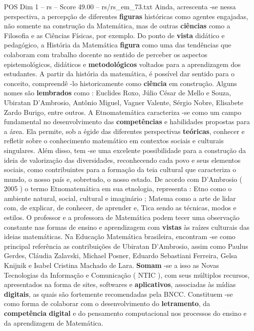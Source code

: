 \begin{textsample}{POS Dim 1 – rs – Score 49.00 – rs/rs\_em\_73.txt}
Ainda, acrescenta -se nessa perspectiva, a percepção de diferentes \textbf{figuras} históricas como agentes engajadas, não somente na construção da Matemática, mas de outras \textbf{ciências} como a Filosofia e as Ciências Físicas, por exemplo.
Do ponto de \textbf{vista} didático e pedagógico, a História da Matemática \textbf{figura} como uma das tendências que colaboram com trabalho docente no sentido de perceber os aspectos epistemológicos, didáticos e \textbf{metodológicos} voltados para a aprendizagem dos estudantes.
A partir da história da matemática, é possível dar sentido para o conceito, compreendê -lo historicamente como \textbf{ciência} em construção.
Alguns nomes são \textbf{lembrados} como : Euclides Roxo, Júlio César de Mello e Souza, Ubiratan D’Ambrosio, Antônio Miguel, Vagner Valente, Sérgio Nobre, Elisabete Zardo Burigo, entre outros.
A Etnomatemática caracteriza -se como um campo fundamental no desenvolvimento das \textbf{competências} e habilidades propostas para a área.
Ela permite, sob a égide das diferentes perspectivas \textbf{teóricas}, conhecer e refletir sobre o conhecimento matemático em contextos sociais e culturais singulares.
Além disso, tem -se uma excelente possibilidade para a construção da ideia de valorização das diversidades, reconhecendo cada povo e seus elementos sociais, como contribuintes para a formação da teia cultural que caracteriza o mundo, o nosso país e, sobretudo, o nosso estado.
De acordo com D’Ambrosio ( 2005 ) o termo Etnomatemática em sua etnologia, representa : Etno como o ambiente natural, social, cultural e imaginário ; Matema como a arte de lidar com, de explicar, de conhecer, de aprender e, Tica sendo as técnicas, modos e estilos.
O professor e a professora de Matemática podem tecer uma observação constante nas formas de ensino e aprendizagem com \textbf{vistas} às raízes culturais das ideias matemáticas.
Na Educação Matemática brasileira, encontram -se como principal referência as contribuições de Ubiratan D’Ambrosio, assim como Paulus Gerdes, Cláudia Zalavski, Michael Posner, Eduardo Sebastiani Ferreira, Gelsa Knijnik e Isabel Cristina Machado de Lara. \textbf{Somam} -se a isso as Novas Tecnologias da Informação e Comunicação ( NTIC ), com seus múltiplos recursos, apresentados na forma de sites, softwares e \textbf{aplicativos}, associadas às mídias \textbf{digitais}, as quais são fortemente recomendadas pela BNCC.
Constituem -se como forma de colaborar com o desenvolvimento do \textbf{letramento}, da \textbf{competência} \textbf{digital} e do pensamento computacional nos processos do ensino e da aprendizagem de Matemática.

\end{textsample}
